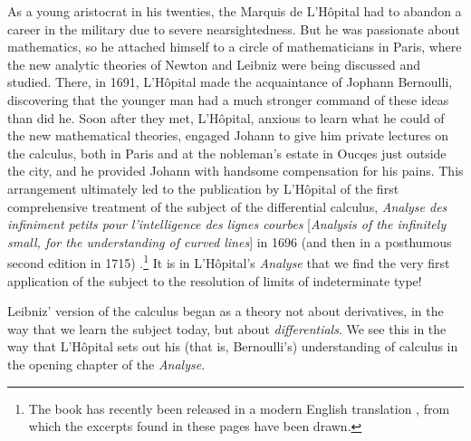 \documentclass[11pt]{article}
\begin{document}
As a young aristocrat in his twenties, the Marquis de L'H\^opital had to abandon a career in the military due to severe nearsightedness. But he was passionate about mathematics, so he attached himself to a circle of mathematicians in Paris, where the new analytic theories of Newton and Leibniz were being discussed and studied. There, in 1691, L'H\^opital made the acquaintance of Jophann Bernoulli, discovering that the younger man had a much stronger command of these ideas than did he. Soon after they met, L'H\^opital, anxious to learn what he could of the new mathematical theories, engaged Johann to give him private lectures on the calculus, both in Paris and at the nobleman's estate in Oucqes just outside the city, and he provided Johann with handsome compensation for his pains. This arrangement ultimately led to the publication by L'H\^opital of the first comprehensive treatment of the subject of the differential calculus, \emph{Analyse des infiniment petits pour l'intelligence des lignes courbes} [\emph{Analysis of the infinitely small, for the understanding of curved lines}] in 1696 (and then in a posthumous second edition in 1715) \citep{LHopital}.\footnote{The book has recently been released in a modern English translation \citep{Bradley}, from which the excerpts found in these pages have been drawn.} It is in L'H\^opital's \emph{Analyse} that we find the very first application of the subject to the resolution of limits of indeterminate type!

Leibniz' version of the calculus began as a theory not about derivatives, in the way that we learn the subject today, but about \emph{differentials}. We see this in the way that L'H\^opital sets out his (that is, Bernoulli's) understanding of calculus in the opening chapter of the \emph{Analyse}.
\end{document}

